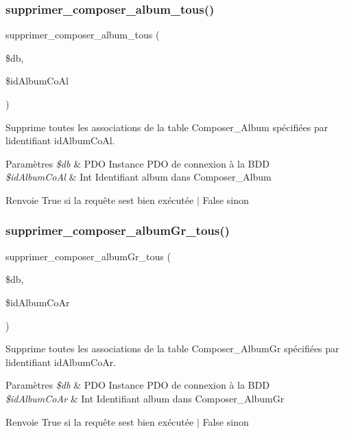 \subsubsection{\texorpdfstring{supprimer\+\_\+composer\+\_\+album\+\_\+tous()}{supprimer\_composer\_album\_tous()}}
{\footnotesize\ttfamily supprimer\+\_\+composer\+\_\+album\+\_\+tous (\begin{DoxyParamCaption}\item[{}]{\$db,  }\item[{}]{\$id\+Album\+Co\+Al }\end{DoxyParamCaption})}



Supprime toutes les associations de la table Composer\+\_\+\+Album spécifiées par l\textquotesingle{}identifiant \textquotesingle{}id\+Album\+Co\+Al\textquotesingle{}. 


\begin{DoxyParams}{Paramètres}
{\em \$db} & P\+DO Instance P\+DO de connexion à la B\+DD \\
\hline
{\em \$id\+Album\+Co\+Al} & Int Identifiant album dans Composer\+\_\+\+Album \\
\hline
\end{DoxyParams}
\begin{DoxyReturn}{Renvoie}
True si la requête s\textquotesingle{}est bien exécutée $\vert$ False sinon 
\end{DoxyReturn}
\mbox{\label{fonctionAlbum_8php_a35ca4d8ff2936c885cded035c4f48b66}} 
\subsubsection{\texorpdfstring{supprimer\+\_\+composer\+\_\+album\+Gr\+\_\+tous()}{supprimer\_composer\_albumGr\_tous()}}
{\footnotesize\ttfamily supprimer\+\_\+composer\+\_\+album\+Gr\+\_\+tous (\begin{DoxyParamCaption}\item[{}]{\$db,  }\item[{}]{\$id\+Album\+Co\+Ar }\end{DoxyParamCaption})}



Supprime toutes les associations de la table Composer\+\_\+\+Album\+Gr spécifiées par l\textquotesingle{}identifiant \textquotesingle{}id\+Album\+Co\+Ar\textquotesingle{}. 


\begin{DoxyParams}{Paramètres}
{\em \$db} & P\+DO Instance P\+DO de connexion à la B\+DD \\
\hline
{\em \$id\+Album\+Co\+Ar} & Int Identifiant album dans Composer\+\_\+\+Album\+Gr \\
\hline
\end{DoxyParams}
\begin{DoxyReturn}{Renvoie}
True si la requête s\textquotesingle{}est bien exécutée $\vert$ False sinon 
\end{DoxyReturn}
